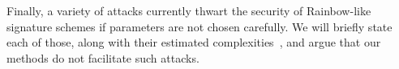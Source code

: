 \documentclass[openright]{report}
\begin{document}
Finally, a variety of attacks currently thwart the security of Rainbow-like
signature schemes if parameters are not chosen carefully. We will briefly
state each of those, along with their estimated complexities~\cite{Petzoldt:201005:inproc},
and argue that our methods do not facilitate such attacks.



\end{document}

